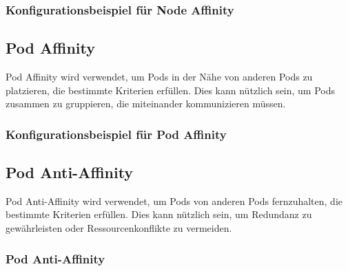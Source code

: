 \subsubsection{Konfigurationsbeispiel für Node Affinity}


\subsection{Pod Affinity}
Pod Affinity wird verwendet, um Pods in der Nähe von anderen Pods zu platzieren, die bestimmte Kriterien erfüllen. Dies kann nützlich sein, um Pods zusammen zu gruppieren, die miteinander kommunizieren müssen.

\subsubsection{Konfigurationsbeispiel für Pod Affinity}


\newpage
\subsection{Pod Anti-Affinity}
Pod Anti-Affinity wird verwendet, um Pods von anderen Pods fernzuhalten, die bestimmte Kriterien erfüllen. Dies kann nützlich sein, um Redundanz zu gewährleisten oder Ressourcenkonflikte zu vermeiden.

\subsubsection{Pod Anti-Affinity}


